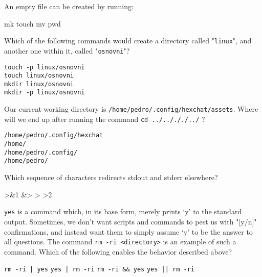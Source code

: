 \documentclass[a4paper,11pt]{exam}
\newcommand{\shell}[1]{\texttt{#1}}
\begin{document}
\begin{questions}
	\question
  An empty file can be created by running:

	\begin{oneparchoices}
		\choice mk
		\CorrectChoice touch
		\choice mv
		\choice pwd
	\end{oneparchoices}
	
	\question
	Which of the following commands would create a directory called "\shell{linux}", and another one within it, called "\shell{osnovni}"? 
	
	\begin{oneparchoices}
		\choice \shell{touch -p linux/osnovni} \\
		\choice \shell{touch linux/osnovni} \\
		\choice \shell{mkdir linux/osnovni} \\
		\CorrectChoice \shell{mkdir -p linux/osnovni}
	\end{oneparchoices}
	
	\question
  Our current working directory is \shell{/home/pedro/.config/hexchat/assets}. Where will we end up after running the command \shell{cd ../../././../} ? 

	\begin{oneparchoices}
		\choice \shell{/home/pedro/.config/hexchat} \\
		\choice \shell{/home/} \\
		\choice \shell{/home/pedro/.config/} \\
		\CorrectChoice \shell{/home/pedro/}
	\end{oneparchoices}
	
	\question
 Which sequence of characters redirects stdout and stderr elsewhere? 
	\begin{oneparchoices}
		>\&1 
		\CorrectChoice \&> 
		\choice >
		\choice >2
	\end{oneparchoices}
	
	\question
\shell{yes} is a command which, in its base form, merely prints ‘y’ to the standard output. Sometimes, we don't want scripts and commands to pest us with "[y/n]" confirmations, and instead want them to simply assume ‘y’ to be the answer to all questions. The command \shell{rm -ri <directory>} is an example of such a command. Which of the following enables the behavior described above?
	
	\begin{oneparchoices}
		\choice \shell{rm -ri | yes} 
		\CorrectChoice \shell{yes | rm -ri} 
		\choice \shell{rm -ri \&\& yes} 
		\choice \shell{yes || rm -ri}
	\end{oneparchoices}
	

\end{questions}
\end{document}
